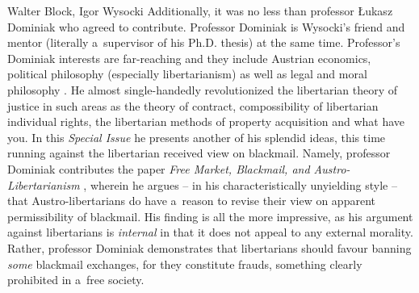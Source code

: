 \begin{editorialeng2auth}{Walter Block, Igor Wysocki}
Additionally, it was no less than professor Łukasz Dominiak who agreed to contribute. Professor Dominiak is Wysocki's friend and mentor (literally a~supervisor of his Ph.D. thesis) at the same time. Professor's Dominiak interests are far-reaching and they include Austrian economics, political philosophy (especially libertarianism) as well as legal and moral philosophy 
\parencites[][]{dominiak_libertarianism_2017}[][]{dominiak_must_2019}[][]{dominiak_contract_2022}. %
 He almost single-handedly revolutionized the libertarian theory of justice in such areas as the theory of contract, compossibility of libertarian individual rights, the libertarian methods of property acquisition and what have you. In this \textit{Special Issue} he presents another of his splendid ideas, this time running against the libertarian received view on blackmail. Namely, professor Dominiak contributes the paper \textit{Free Market, Blackmail, and Austro-Libertarianism} 
\parencite*[][]{dominiak_free_2024}, %
 wherein he argues -- in his characteristically unyielding style -- that Austro-libertarians do have a~reason to revise their view on apparent permissibility of blackmail. His finding is all the more impressive, as his argument against libertarians is \textit{internal} in that it does not appeal to any external morality. Rather, professor Dominiak demonstrates that libertarians should favour banning \textit{some} blackmail exchanges, for they constitute frauds, something clearly prohibited in a~free society.




\end{editorialeng2auth}
